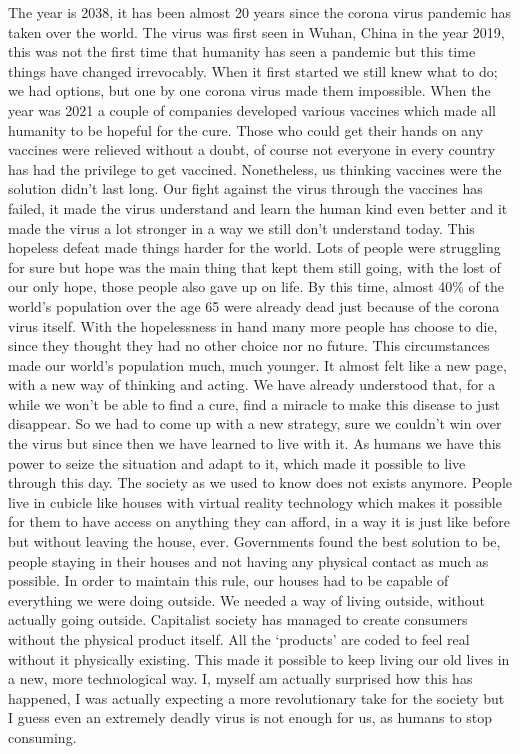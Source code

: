 \documentclass[]{book}
\begin{document}
The year is 2038, it has been almost 20 years since the corona virus pandemic has taken over the world. The virus was first seen in Wuhan, China in the year 2019, this was not the first time that humanity has seen a pandemic but this time things have changed irrevocably. When it first started we still knew what to do; we had options, but one by one corona virus made them impossible. When the year was 2021 a couple of companies developed various vaccines which made all humanity to be hopeful for the cure. Those who could get their hands on any vaccines were relieved without a doubt, of course not everyone in every country has had the privilege to get vaccined. Nonetheless, us thinking vaccines were the solution didn't last long. Our fight against the virus through the vaccines has failed, it made the virus understand and learn the human kind even better and it made the virus a lot stronger in a way we still don't understand today. This hopeless defeat made things harder for the world. Lots of people were struggling for sure but hope was the main thing that kept them still going, with the lost of our only hope, those people also gave up on life. By this time, almost 40\% of the world's population over the age 65 were already dead just because of the corona virus itself. With the hopelessness in hand many more people has choose to die, since they thought they had no other choice nor no future. This circumstances made our world's population much, much younger. It almost felt like a new page, with a new way of thinking and acting. We have already understood that, for a while we won't be able to find a cure, find a miracle to make this disease to just disappear. So we had to come up with a new strategy, sure we couldn't win over the virus but since then we have learned to live with it. As humans we have this power to seize the situation and adapt to it, which made it possible to live through this day. The society as we used to know does not exists anymore. People live in cubicle like houses with virtual reality technology which makes it possible for them to have access on anything they can afford, in a way it is just like before but without leaving the house, ever. Governments found the best solution to be, people staying in their houses and not having any physical contact as much as possible. In order to maintain this rule, our houses had to be capable of everything we were doing outside. We needed a way of living outside, without actually going outside. Capitalist society has managed to create consumers without the physical product itself. All the `products' are coded to feel real without it physically existing. This made it possible to keep living our old lives in a new, more technological way. I, myself am actually surprised how this has happened, I was actually expecting a more revolutionary take for the society but I guess even an extremely deadly virus is not enough for us, as humans to stop consuming.
\end{document}
